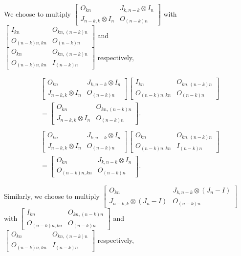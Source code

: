 We choose to multiply $\begin{bmatrix}
        O_{kn} & J_{k,n-k} \otimes I_n \\
        J_{n-k,k}\otimes I_n & O_{(n-k)n}
    \end{bmatrix}$ with $\begin{bmatrix}
        I_{kn} & O_{kn, (n-k)n} \\
        O_{(n-k)n,kn} & O_{(n-k)n}
    \end{bmatrix}$ and \\$\begin{bmatrix}
        O_{kn} & O_{kn, (n-k)n} \\
        O_{(n-k)n,kn} & I_{(n - k)n}
    \end{bmatrix}$ respectively,

\begin{align*}
    &\begin{bmatrix}
        O_{kn} & J_{k,n-k} \otimes I_n \\
        J_{n-k,k}\otimes I_n & O_{(n-k)n}
    \end{bmatrix}\begin{bmatrix}
        I_{kn} & O_{kn, (n-k)n} \\
        O_{(n-k)n,kn} & O_{(n-k)n}
    \end{bmatrix}\\
    &=\begin{bmatrix}
        O_{kn} & O_{kn, (n-k)n} \\
        J_{n-k,k}\otimes I_n & O_{(n-k)n}
    \end{bmatrix}.\\\\
    &\begin{bmatrix}
        O_{kn} & J_{k,n-k} \otimes I_n \\
        J_{n-k,k}\otimes I_n & O_{(n-k)n}
    \end{bmatrix}\begin{bmatrix}
        O_{kn} & O_{kn, (n-k)n} \\
        O_{(n-k)n,kn} & I_{(n - k)n}
    \end{bmatrix}\\
    &= \begin{bmatrix}
        O_{kn} & J_{k,n-k} \otimes I_n \\
        O_{(n-k)n,kn} & O_{(n-k)n}
    \end{bmatrix}.
\end{align*}

Similarly, we choose to multiply $\begin{bmatrix}
        O_{kn} & J_{k,n-k} \otimes (J_n-I) \\
        J_{n-k,k}\otimes (J_n-I) & O_{(n-k)n}
    \end{bmatrix}$ with $\begin{bmatrix}
        I_{kn} & O_{kn, (n-k)n} \\
        O_{(n-k)n,kn} & O_{(n-k)n}
    \end{bmatrix}$ and \\$\begin{bmatrix}
        O_{kn} & O_{kn, (n-k)n} \\
        O_{(n-k)n,kn} & I_{(n - k)n}
    \end{bmatrix}$ respectively,

